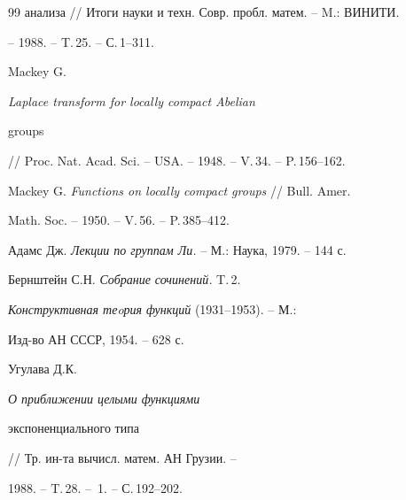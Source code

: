 \begin{thebibliography}{99}
{анализа} // Итоги науки и техн. Совр. пробл. матем. -- M.: ВИНИТИ.


-- 1988. -- T.\,25. -- С.\,1--311.







Mackey G. {\em Laplace transform for locally compact Abelian


groups} // Proc. Nat. Acad. Sci. -- USA. -- 1948. -- V.\,34. -- P.\,156--162.







Mackey G. {\em Functions on locally compact groups} // Bull. Amer. 


Math. Soc. -- 1950. -- V.\,56. -- P.\,385--412.







Адамс Дж. {\it Лекции по группам Ли.} -- М.: Наука, 1979. -- 144 с.







Бернштейн С.Н. {\it Собрание сочинений.} T.\,2.


{\em Конструктивная теoрия функций} (1931--1953). -- М.:


Изд-во АН СССР, 1954. -- 628 с. 







Угулава Д.К. {\it О приближении целыми функциями 


экспоненциального типа} // Тр. ин-та вычисл. матем. АН Грузии. -- 


1988. -- T.\,28. -- \No\,1. -- С.\,192--202.





\end{thebibliography}





\vskip 2cm














\label{end}





